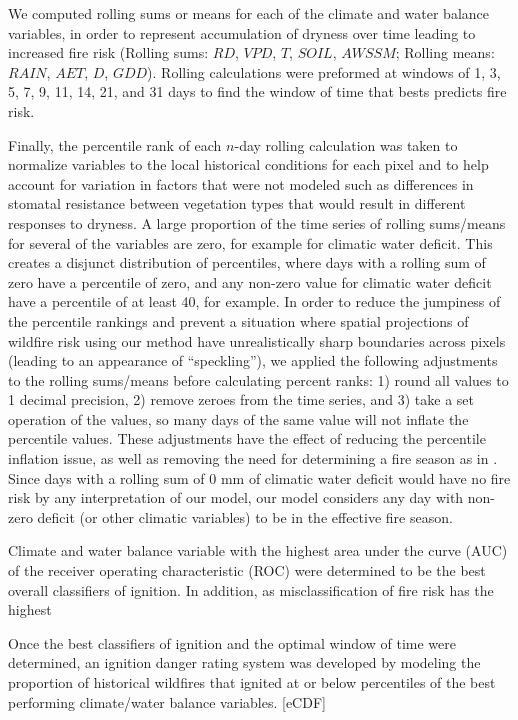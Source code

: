 \documentclass[11pt]{article}
\begin{document}
We computed rolling sums or means for each of the climate and water balance variables, in order to represent accumulation of dryness over time leading to increased fire risk (Rolling sums: $RD$, $VPD$, $T$, $SOIL$, $AWSSM$; Rolling means: $RAIN$, $AET$, $D$, $GDD$).  Rolling calculations were preformed at windows of 1, 3, 5, 7, 9, 11, 14, 21, and 31 days to find the window of time that bests predicts fire risk.

Finally, the percentile rank of each $n$-day rolling calculation was taken to normalize variables to the local historical conditions for each pixel and to help account for variation in factors that were not modeled such as differences in stomatal resistance between vegetation types that would result in different responses to dryness.  A large proportion of the time series of rolling sums/means for several of the variables are zero, for example for climatic water deficit.  This creates a disjunct distribution of percentiles, where days with a rolling sum of zero have a percentile of zero, and any non-zero value for climatic water deficit have a percentile of at least 40, for example.  In order to reduce the jumpiness of the percentile rankings and prevent a situation where spatial projections of wildfire risk using our method have unrealistically sharp boundaries across pixels (leading to an appearance of ``speckling''), we applied the following adjustments to the rolling sums/means before calculating percent ranks: 1) round all values to 1 decimal precision, 2) remove zeroes from the time series, and 3) take a set operation of the values, so many days of the same value will not inflate the percentile values. These adjustments have the effect of reducing the percentile inflation issue, as well as removing the need for determining a fire season as in \citet{thomaWaterBalanceIndicator2020}.  Since days with a rolling sum of 0 mm of climatic water deficit would have no fire risk by any interpretation of our model, our model considers any day with non-zero deficit (or other climatic variables) to be in the effective fire season.

Climate and water balance variable with the highest area under the curve (AUC) of the receiver operating characteristic (ROC) were determined to be the best overall classifiers of ignition.  In addition, as misclassification of fire risk has the highest 

Once the best classifiers of ignition and the optimal window of time were determined, an ignition danger rating system was developed by modeling the proportion of historical wildfires that ignited at or below percentiles of the best performing climate/water balance variables. [eCDF]
\end{document}
